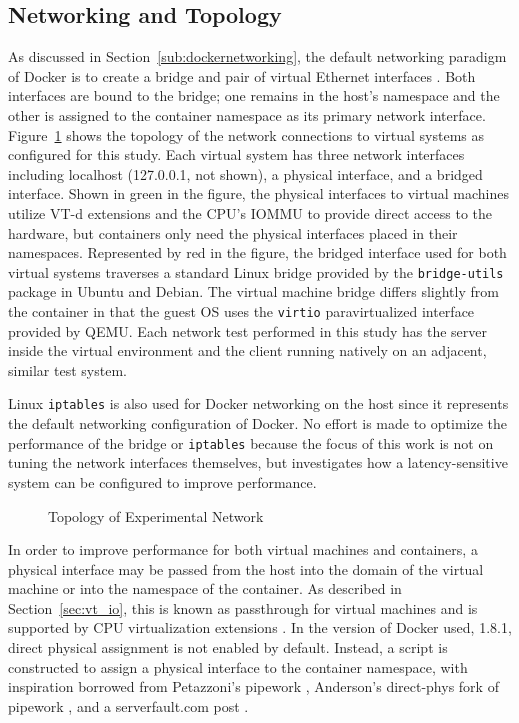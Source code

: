 
\subsection{Networking and Topology} %
\label{sub:expt_networking}
As discussed in Section~\ref{sub:dockernetworking}, the default networking paradigm of Docker is to create a bridge and pair of virtual Ethernet interfaces \autocite{dockernetworking1}.
Both interfaces are bound to the bridge; one remains in the host's namespace and the other is assigned to the container namespace as its primary network interface.
Figure~\ref{fig:topology_bridged_vm} shows the topology of the network connections to virtual systems as configured for this study.
Each virtual system has three network interfaces including localhost (127.0.0.1, not shown), a physical interface, and a bridged interface.
Shown in green in the figure, the physical interfaces to virtual machines utilize VT-d extensions and the CPU's IOMMU to provide direct access to the hardware, but containers only need the physical interfaces placed in their namespaces.
Represented by red in the figure, the bridged interface used for both virtual systems traverses a standard Linux bridge provided by the \texttt{bridge-utils} package in Ubuntu and Debian.
The virtual machine bridge differs slightly from the container in that the guest OS uses the \texttt{virtio} paravirtualized interface provided by QEMU.
Each network test performed in this study has the server inside the virtual environment and the client running natively on an adjacent, similar test system.

Linux \texttt{iptables} is also used for Docker networking on the host since it represents the default networking configuration of Docker.
No effort is made to optimize the performance of the bridge or \texttt{iptables} because the focus of this work is not on tuning the network interfaces themselves, but investigates how a latency-sensitive system can be configured to improve performance.

\begin{figure}
    \centering
    \def\svgwidth{\columnwidth}
    
    \caption{Topology of Experimental Network}
    \label{fig:topology_bridged_vm}
\end{figure}

In order to improve performance for both virtual machines and containers, a physical interface may be passed from the host into the domain of the virtual machine or into the namespace of the container.
As described in Section~\ref{sec:vt_io}, this is known as passthrough for virtual machines and is supported by CPU virtualization extensions \autocite{_grinberg_1}.
In the version of Docker used, 1.8.1, direct physical assignment is not enabled by default.
Instead, a script is constructed to assign a physical interface to the container namespace, with inspiration borrowed from Petazzoni's pipework \autocite{pipework1jpetazzo}, Anderson's direct-phys fork of pipework \autocite{pipework1Rakurai}, and a serverfault.com post \autocite{serverfault1}. 

